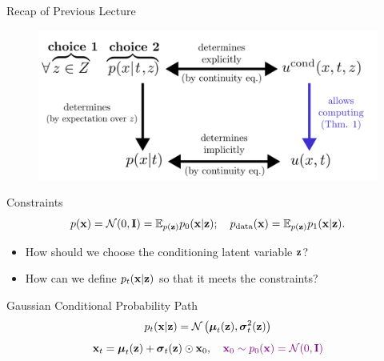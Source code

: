 \documentclass{beamer}
\begin{document}
\begin{frame}
\titlepage
	\resetonslide
\end{frame}
\begin{frame}{Recap of Previous Lecture}
	\begin{figure}
		\centering
		\includegraphics[width=0.7\linewidth]{figs/cfm_uncond_to_cond}
	\end{figure}
	\vspace{-0.3cm}
	\begin{block}{Constraints}
		\vspace{-0.3cm}
		\[
			p(\mathbf{x}) = \mathcal{N}(0, \mathbf{I}) = \mathbb{E}_{p(\mathbf{z})} p_0(\mathbf{x} | \mathbf{z}); \quad p_{\text{data}}(\mathbf{x}) = \mathbb{E}_{p(\mathbf{z})} p_1(\mathbf{x} | \mathbf{z}).
		\]
		\vspace{-0.5cm}
	\end{block}
	\begin{itemize}
		\item How should we choose the conditioning latent variable $\mathbf{z}$?
		\item How can we define $p_t(\mathbf{x} | \mathbf{z})$ so that it meets the constraints?
	\end{itemize}
	\begin{block}{Gaussian Conditional Probability Path}
		\vspace{-0.3cm}
		\[
			p_t(\mathbf{x} | \mathbf{z}) = \mathcal{N}\left(\boldsymbol{\mu}_t(\mathbf{z}), \boldsymbol{\sigma}_t^2(\mathbf{z})\right)
		\]
		\[
			\mathbf{x}_t = \boldsymbol{\mu}_t(\mathbf{z}) + \boldsymbol{\sigma}_t(\mathbf{z}) \odot \mathbf{x}_0, \quad {\color{violet} \mathbf{x}_0 \sim p_0(\mathbf{x}) = \mathcal{N}(0, \mathbf{I})}
		\]
	\end{block}
\end{frame}
\end{document}
